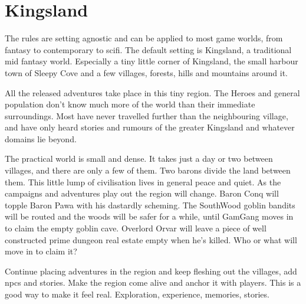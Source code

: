 \clearpage %


\section*{Kingsland}

The rules are setting agnostic and can be applied to most game worlds, from fantasy to contemporary to scifi. The default setting is Kingsland, a traditional mid fantasy world. Especially a tiny little corner of Kingsland, the small harbour town of Sleepy Cove and a few villages, forests, hills and mountains around it.

All the released adventures take place in this tiny region. The Heroes and general population don't know much more of the world than their immediate surroundings. Most have never travelled further than the neighbouring village, and have only heard stories and rumours of the greater Kingsland and whatever domains lie beyond.

The practical world is small and dense. It takes just a day or two between villages, and there are only a few of them. Two barons divide the land between them. This little lump of civilisation lives in general peace and quiet. As the campaigns and adventures play out the region will change. Baron Conq will topple Baron Pawa with his dastardly scheming. The SouthWood goblin bandits will be routed and the woods will be safer for a while, until GamGang moves in to claim the empty goblin cave. Overlord Orvar will leave a piece of well constructed prime dungeon real estate empty when he's killed. Who or what will move in to claim it?

Continue placing adventures in the region and keep fleshing out the villages, add npcs and stories. Make the region come alive and anchor it with players. This is a good way to make it feel real. Exploration, experience, memories, stories.



\vfill

